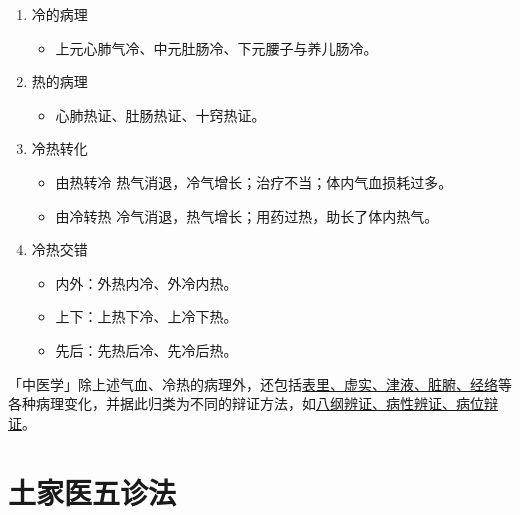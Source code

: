 \documentclass[cn,black,12pt,normal,founder]{elegantnote}
\begin{document}
\begin{enumerate}
  \item 冷的病理
  \begin{itemize}
    \item 上元心肺气冷、中元肚肠冷、下元腰子与养儿肠冷。
  \end{itemize}

  \item 热的病理
  \begin{itemize}
    \item 心肺热证、肚肠热证、十窍热证。
  \end{itemize}

  \item 冷热转化
  \begin{itemize}
    \item 由热转冷
    \subitem 热气消退，冷气增长；治疗不当；体内气血损耗过多。
    \item 由冷转热
    \subitem 冷气消退，热气增长；用药过热，助长了体内热气。
  \end{itemize}
  \item 冷热交错
  \begin{itemize}
    \item 内外：外热内冷、外冷内热。
    \item 上下：上热下冷、上冷下热。
    \item 先后：先热后冷、先冷后热。
  \end{itemize}
\end{enumerate}

\begin{note}
  「中医学」除上述气血、冷热的病理外，还包括\uline{表里、虚实、津液、脏腑、经络}等各种病理变化，并据此归类为不同的辩证方法，如\uline{八纲辨证、病性辨证、病位辩证}。
\end{note}

\section{土家医五诊法}
\end{document}
